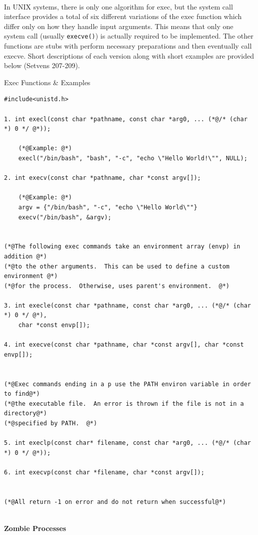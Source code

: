 \documentclass[12pt]{extarticle}
\newenvironment{myindentpar}[1]%
 {\begin{list}{}%
         {\setlength{\leftmargin}{#1}}%
         \item[]%
 }
 {\end{list}}
\newcommand{\code}[1]{\colorbox{codegray}{\texttt{#1}}}
\begin{document}
\begin{myindentpar}{5mm}
    \ \\
    In UNIX systems, there is only one algorithm for exec, but the system call interface provides a total of six different variations of the exec function which differ only on how they handle input arguments.  This means that only one system call (usually \code{execve()}) is actually required to be implemented.  The other functions are stubs with perform necessary preparations and then eventually call execve.  Short descriptions of each version along with short examples are provided below (Setvens 207-209).  

    \begin{center}
        Exec Functions \& Examples
    \end{center}
\begin{lstlisting}[frame=single]
#include<unistd.h>

1. int execl(const char *pathname, const char *arg0, ... (*@/* (char *) 0 */ @*));

    (*@Example: @*)
    execl("/bin/bash", "bash", "-c", "echo \"Hello World!\"", NULL);

2. int execv(const char *pathname, char *const argv[]);

    (*@Example: @*)
    argv = {"/bin/bash", "-c", "echo \"Hello World\""}
    execv("/bin/bash", &argv);


(*@The following exec commands take an environment array (envp) in addition @*)
(*@to the other arguments.  This can be used to define a custom environment @*)
(*@for the process.  Otherwise, uses parent's environment.  @*)

3. int execle(const char *pathname, const char *arg0, ... (*@/* (char *) 0 */ @*), 
    char *const envp[]);

4. int execve(const char *pathname, char *const argv[], char *const envp[]);


(*@Exec commands ending in a p use the PATH environ variable in order to find@*)
(*@the executable file.  An error is thrown if the file is not in a directory@*)
(*@specified by PATH.  @*)

5. int execlp(const char* filename, const char *arg0, ... (*@/* (char *) 0 */ @*));

6. int execvp(const char *filename, char *const argv[]);


(*@All return -1 on error and do not return when successful@*)
\end{lstlisting}

    \ \\
    \textbf{Zombie Processes}
    

\end{myindentpar}
\end{document}
